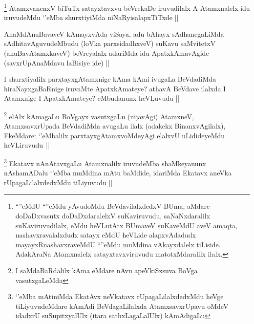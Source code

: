 \begin{artha}
\footnote{``\stext''eMdU ``\stext''eMdu yAvudoMdu BeVdavilalxdedxV BUma, aMdare doDaDxvasutx doDaDxdaralelxV suKaviruvudu, saNaNxdaralilx suKaviruvudilalx, eMdu heVLutAtx BUmaveV suKaveMdU aveV amaqta, nashavxravalalxdudx satayx eMdU heVLide alapxvAdadudx mayayxRnashavxraveMdU ``\stext''eMdu muMdina vAkayxdalelx tiLiside. AdakAraNa Atamxnalelx satayxtavxviruvudu matotxMdaralilx ilalx.}
AtamxvanenxV biTuTx satayxtavxvu beVrekaDe iruvudilalx A Atamxnalelx idu iruvudeMdu `\stext'eMba shurxtiyiMda niNaRyisalapxTiTxde ||
\end{artha}


\begin{artha}
AnaMdAnuBavaveV kAmayxvAda viSaya, adu bAhayx sAdhanegaLiMda sAdhitavAguvudeMbudu (loVka parxsidadhxveV) suKavu saMvitetxV (anuBavAtamxkaveV) beVreyalalx adariMda idu ApatxkAmavAgide (savxrUpAnaMdavu laBisiye ide) ||
\end{artha}


\begin{artha}
I shurxtiyalilx parxtayxgAtamxnige kAma kAmi ivugaLa BeVdadiMda hiraNayxgaBaRnige iruvaMte ApatxkAmateye? athavA BeVdave ilalxda I Atamxnige I ApatxkAmateye? eMbudanunx heVLuvudu ||
\end{artha}

\begin{artha}
\footnote{I saMdaBaRdalilx kAma eMdare nAvu apeVkiSxsuva BoVga vasutxgaLeMda}
elAlx kAmagaLu BoVgayx vasutxgaLu (nijavAgi) AtamxneV, AtamxsavxrUpada BeVdadiMda avugaLu ilalx (adakekx BinanxvAgilalx), EkeMdare: `\stext'eMbalilx parxtayxgAtamxvoMdeyAgi elalxvU uLidideyeMdu heVLiruvudu ||
\end{artha}


\begin{artha}
\footnote{`\stext'eMba mAtiniMda EkatAvx neVkatavx rUpagaLilalxdedxMdu heVge tiLiyuvudeMdare kAmAdi BeVdagaLilalxda AtamxsavxrUpavu oMdeV idadxrU suSupitxyalUlx (itara sathxLagaLalUlx) kAmAdigaLu}
Ekatavx nAnAtavxgaLu Atamxnalilx iruvudeMba shaMkeyanunx nAshamADalu `\stext'eMba muMdina mAtu baMdide, idariMda Ekatavx aneVka rUpagaLilalxdedxMdu tiLiyuvudu ||
\end{artha}

